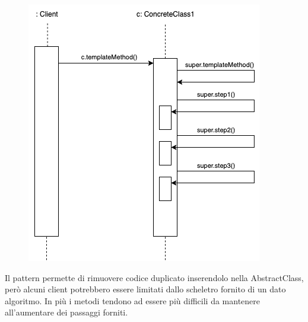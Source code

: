 \begin{figure}[H]
    \centering
    \includegraphics[width=0.5\linewidth]{assets/pattern/template/template-sequence.drawio.png}
\end{figure}

Il pattern permette di rimuovere codice duplicato inserendolo nella AbstractClass, però alcuni client potrebbero essere limitati dallo scheletro fornito di un dato algoritmo. In più i metodi tendono ad essere più difficili da mantenere all'aumentare dei passaggi forniti.



\newpage